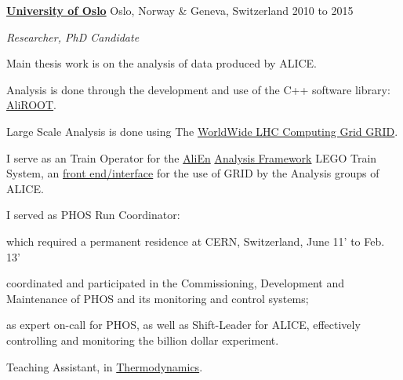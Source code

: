 \documentclass[11pt]{article}
\newenvironment{outerlist}[1][\enskip\textbullet]%
        {\begin{itemize}[#1]}{\end{itemize}%
         \vspace{-.6\baselineskip}}
\newenvironment{innerlist}[1][\enskip\textbullet]%
        {\begin{compactitem}[#1]}{\end{compactitem}}
\newcommand{\blankline}{\quad\pagebreak[2]}
\begin{document}
\href{http://www.uib.no/en}{\textbf{University of Oslo}}
Oslo, Norway \& Geneva, Switzerland
\hfill 2010 to 2015
\begin{outerlist}
\item[] \textit{Researcher, PhD Candidate}
  \begin{innerlist}
    \footnotesize
  \item Main thesis work is on the analysis of data produced by ALICE.
    \begin{innerlist}
    \item Analysis is done through the development and use of the
      C++ software library:
      \href{http://aliweb.cern.ch/Offline/AliRoot/Manual.html}{AliROOT}.
    \item Large Scale Analysis is done using The
      \href{http://wlcg.web.cern.ch/}{WorldWide LHC Computing Grid GRID}.
    \item I serve as an Train Operator for the \href{alien2.cern.ch}{AliEn}
      \href{http://aliweb.cern.ch/Offline/Activities/Analysis/AnalysisFramework/index.html}{Analysis Framework} LEGO Train System, an
      \href{http://alimonitor.cern.ch/map.jsp}{front end/interface}
      for the use of GRID by the Analysis groups of ALICE.
    \end{innerlist}
  \item I served as PHOS Run Coordinator:
    \begin{innerlist}
    \item which required a permanent residence at CERN, Switzerland,
      June 11' to Feb. 13'
    \item coordinated and participated in the Commissioning,
      Development and Maintenance of PHOS and its monitoring and control systems;
    \item as expert on-call for PHOS, as well as Shift-Leader for ALICE,
      effectively controlling and monitoring the billion dollar experiment.
    \end{innerlist}
  \item Teaching Assistant, in \href{http://www.uio.no/studier/emner/matnat/fys/FYS2160/index-eng.html}{Thermodynamics}.
  \end{innerlist}
\end{outerlist}

\blankline
\end{document}
